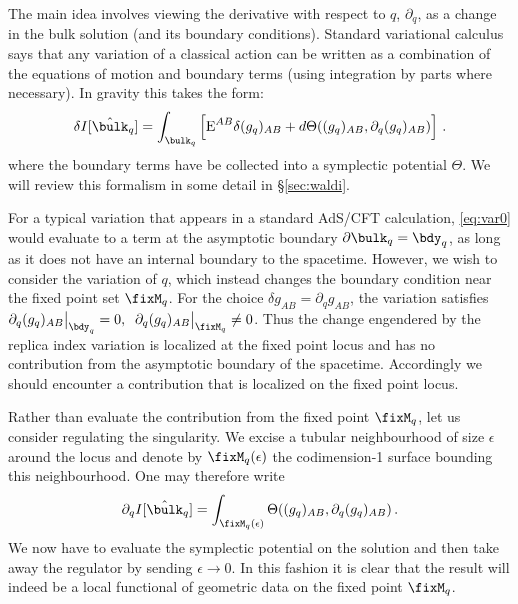 \documentclass[12pt,openany]{book}
\begin{document}
The main idea involves viewing the derivative with respect to $q$,  $\partial_q$, as a change in the bulk solution (and its boundary conditions). Standard variational calculus says that any variation of a classical action can be written as a combination of the equations of motion and boundary terms (using integration by parts where necessary). In gravity this takes the form:
%
 \begin{equation}
 \delta I[\hat{\bulk}_q]=\int_{\bulk_q} \left[\text{E}^{AB} \delta (g_q)_{AB}+d \Theta((g_q)_{AB},\partial_q (g_q)_{AB}) \right] \,.
 \label{eq:var0}
 \end{equation}
 where the boundary terms have be collected into a symplectic potential $\Theta$. We will review this formalism in some detail in \S\ref{sec:waldi}.

For a typical variation that appears in a standard AdS/CFT calculation, \eqref{eq:var0} would evaluate to a term at the asymptotic boundary  $\partial \bulk_q =\bdy_q$, as long as it does not have an internal boundary to the spacetime.
 However,  we wish to consider the variation of $q$, which instead changes the boundary condition near the fixed point set $\fixM_q$. For the choice $\delta g_{AB}=\partial_q g_{AB}$, the variation satisfies $\partial_q (g_q)_{AB} \big|_{\bdy_q}=0,\;\; \partial_q (g_q)_{AB}\big|_{\fixM_q} \not = 0$. Thus the change engendered by the replica index variation is localized at the fixed point locus and has no contribution from the asymptotic boundary of the spacetime.  Accordingly we should encounter a contribution that is localized on the fixed point locus.

Rather than evaluate the contribution from the fixed point $\fixM_q$, let us consider regulating the singularity. We excise a tubular neighbourhood of size $\epsilon$ around the locus and denote by $\fixM_q(\epsilon)$ the codimension-1 surface bounding this neighbourhood.
 One may therefore write
%
 \begin{equation}
 \partial_q I[\hat{\bulk}_q]=\int_{\fixM_q(\epsilon)} \Theta((g_q)_{AB},\partial_q (g_q)_{AB}) \,.
 \label{eq:var1}
\end{equation}
We now have to evaluate the symplectic potential on the solution and then take away the regulator by sending $\epsilon \to 0$. In this fashion it is clear that the result will indeed be a local functional of geometric data on the fixed point $\fixM_q$.
\end{document}
